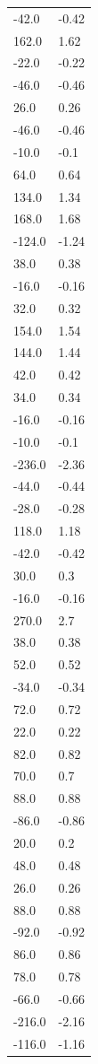 \begin{longtable}{ll}
-42.0 & -0.42 \\
162.0 & 1.62 \\
-22.0 & -0.22 \\
-46.0 & -0.46 \\
26.0 & 0.26 \\
-46.0 & -0.46 \\
-10.0 & -0.1 \\
64.0 & 0.64 \\
134.0 & 1.34 \\
168.0 & 1.68 \\
-124.0 & -1.24 \\
38.0 & 0.38 \\
-16.0 & -0.16 \\
32.0 & 0.32 \\
154.0 & 1.54 \\
144.0 & 1.44 \\
42.0 & 0.42 \\
34.0 & 0.34 \\
-16.0 & -0.16 \\
-10.0 & -0.1 \\
-236.0 & -2.36 \\
-44.0 & -0.44 \\
-28.0 & -0.28 \\
118.0 & 1.18 \\
-42.0 & -0.42 \\
30.0 & 0.3 \\
-16.0 & -0.16 \\
270.0 & 2.7 \\
38.0 & 0.38 \\
52.0 & 0.52 \\
-34.0 & -0.34 \\
72.0 & 0.72 \\
22.0 & 0.22 \\
82.0 & 0.82 \\
70.0 & 0.7 \\
88.0 & 0.88 \\
-86.0 & -0.86 \\
20.0 & 0.2 \\
48.0 & 0.48 \\
26.0 & 0.26 \\
88.0 & 0.88 \\
-92.0 & -0.92 \\
86.0 & 0.86 \\
78.0 & 0.78 \\
-66.0 & -0.66 \\
-216.0 & -2.16 \\
-116.0 & -1.16 \\

\end{longtable}
